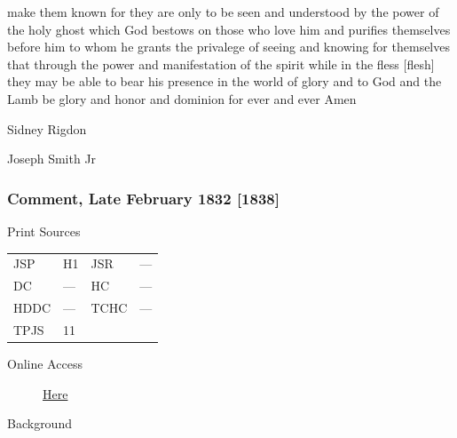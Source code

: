 make them known for they are only to be seen and understood by the power of the holy ghost which God bestows on those who love him and purifies themselves before him to whom he grants the privalege of seeing and knowing for themselves that through the power and manifestation of the spirit while in the fless [flesh] they may be able to bear his presence in the world of glory and to God and the Lamb be glory and honor and dominion for ever and ever Amen
				
				\begin{tightright}
				Sidney Rigdon
				
				Joseph Smith Jr
				\end{tightright}
		
		\subsubsection{Comment, Late February 1832 [1838]}
			\label{EMS-1832-JS-LAT-FEB-1832}
		
			\begin{description}
				\item[Print Sources]
			\end{description}

				\begin{tabular}{p{0.5in}p{1in}p{0.5in}p{1in}}
				JSP	 	& H1	& JSR 		& --- \\
				DC	 	& ---	& HC 		& --- \\
				HDDC 	& ---	& TCHC 		& --- \\
				TPJS 	& 11			& 	 		&  \\
				\end{tabular}
			
			\begin{description}
				\item[Online Access] \href{https://www.josephsmithpapers.org/paper-summary/history-1838-1856-volume-a-1-23-december-1805-30-august-1834/198}{Here}
			\end{description}
			
			\begin{description}
				\item[Background]
			\end{description}
			
			

